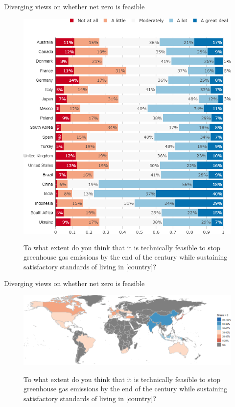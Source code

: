 \begin{frame}{Diverging views on whether net zero is feasible}%
	\begin{figure}[h!]
	\centering
	\caption{To what extent do you think that it is technically feasible to stop greenhouse gas emissions by the end of the century while sustaining satisfactory standards of living in [country]?}
	\includegraphics[height=.8\textheight]{../figures/country_comparison/net_zero_feasible_countries.png} \\
	\end{figure}
\end{frame}
	
\begin{frame}{Diverging views on whether net zero is feasible}%
	\begin{figure}[h!]
	\centering
	\caption{To what extent do you think that it is technically feasible to stop greenhouse gas emissions by the end of the century while sustaining satisfactory standards of living in [country]?}
	\includegraphics[width=\textwidth]{../figures/maps/net_zero_feasible.png} \\
	\end{figure}
\end{frame}
	
